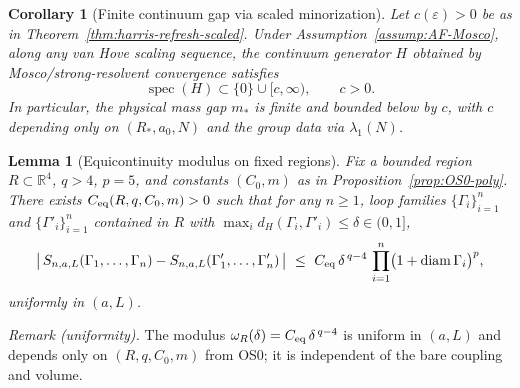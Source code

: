 \documentclass[11pt]{amsart}
\theoremstyle{plain}
\newtheorem{lemma}[theorem]{Lemma}
\newtheorem{corollary}[theorem]{Corollary}
\theoremstyle{definition}
\theoremstyle{remark}
\begin{document}
\begin{corollary}[Finite continuum gap via scaled minorization]\label{cor:scaled-continuum-gap}
Let $c(\varepsilon)>0$ be as in Theorem~\ref{thm:harris-refresh-scaled}. Under Assumption~\ref{assump:AF-Mosco}, along any van Hove scaling sequence, the continuum generator $H$ obtained by Mosco/strong-resolvent convergence satisfies
\[
  \operatorname{spec}(H)\subset\{0\}\cup[c,\infty),\qquad c>0.
\]
In particular, the physical mass gap $m_*$ is finite and bounded below by $c$, with $c$ depending only on $(R_*,a_0,N)$ and the group data via $\lambda_1(N)$.
\end{corollary}
\medskip
\begin{lemma}[Equicontinuity modulus on fixed regions]\label{lem:eqc-modulus}
Fix a bounded region $R\subset\mathbb R^4$, $q>4$, $p=5$, and constants $(C_0,m)$ as in Proposition~\ref{prop:OS0-poly}. There exists $C_{\rm eq}(R,q,C_0,m)>0$ such that for any $n\ge 1$, loop families $\{\Gamma_i\}_{i=1}^n$ and $\{\Gamma'_i\}_{i=1}^n$ contained in $R$ with $\max_i d_H(\Gamma_i,\Gamma'_i)\le \delta\in(0,1]$,
\[
  \big|\,S_{n,a,L}(\Gamma_1,\dots,\Gamma_n) - S_{n,a,L}(\Gamma'_1,\dots,\Gamma'_n)\,\big|
  \ \le\ C_{\rm eq}\,\delta^{\,q-4}\,\prod_{i=1}^n \bigl(1+\operatorname{diam}\Gamma_i\bigr)^p,
\]
uniformly in $(a,L)$.
\end{lemma}

\noindent\emph{Remark (uniformity).} The modulus $\omega_R(\delta)=C_{\rm eq}\,\delta^{\,q-4}$ is uniform in $(a,L)$ and depends only on $(R,q,C_0,m)$ from OS0; it is independent of the bare coupling and volume.
\end{document}

